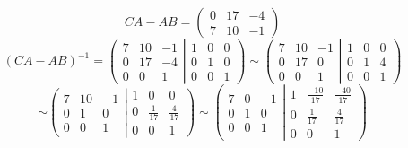\documentclass{article}
\begin{document}
\[
    CA-AB=
    \left(\begin{array}{ccc}
            0 & 17 & -4 \\
            7 & 10 & -1
        \end{array}
    \right)
\]
\[
    (CA-AB)^{-1}=
    \left(\begin{array}{ccc}
            7 & 10 & -1 \\
            0 & 17 & -4 \\
            0 & 0  & 1
        \end{array}\left|
    \begin{array}{ccc}
            1 & 0 & 0 \\
            0 & 1 & 0 \\
            0 & 0 & 1
        \end{array}\right.
    \right)
    \sim
    \left(\begin{array}{ccc}
            7 & 10 & -1 \\
            0 & 17 & 0  \\
            0 & 0  & 1
        \end{array}\left|
    \begin{array}{ccc}
            1 & 0 & 0 \\
            0 & 1 & 4 \\
            0 & 0 & 1
        \end{array}\right.
    \right)
\]
\[
    \sim
    \left(\begin{array}{ccc}
            7 & 10 & -1 \\
            0 & 1  & 0  \\
            0 & 0  & 1
        \end{array}\left|
    \begin{array}{ccc}
            1 & 0            & 0            \\
            0 & \frac{1}{17} & \frac{4}{17} \\
            0 & 0            & 1
        \end{array}\right.
    \right)
    \sim
    \left(\begin{array}{ccc}
            7 & 0 & -1 \\
            0 & 1 & 0  \\
            0 & 0 & 1
        \end{array}\left|
    \begin{array}{ccc}
            1 & \frac{-10}{17} & \frac{-40}{17} \\
            0 & \frac{1}{17}   & \frac{4}{17}   \\
            0 & 0              & 1
        \end{array}\right.
    \right)
\]
\end{document}
